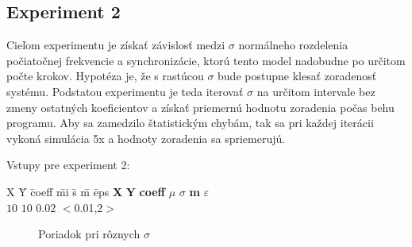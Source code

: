 \documentclass[a4paper, 11pt]{article}
\begin{document}
\subsection{Experiment 2}
Cieľom experimentu je získať závislosť medzi $\sigma$ normálneho rozdelenia počiatočnej frekvencie a synchronizácie, ktorú tento model nadobudne po určitom počte krokov. Hypotéza je, že s rastúcou $\sigma$ bude postupne klesať zoradenosť systému. Podstatou experimentu je teda iterovať $\sigma$ na určitom intervale bez zmeny ostatných koeficientov a získať priemernú hodnotu zoradenia počas behu programu. Aby sa zamedzilo štatistickým chybám, tak sa pri každej iterácii vykoná simulácia 5x a hodnoty zoradenia sa spriemerujú.


\noindent Vstupy pre experiment 2:
\begin{tabbing}
    X \quad \quad \quad \quad\= Y \quad \quad \quad \quad\= coeff \quad  \quad \quad \quad\= mi \quad  \= s \quad  \quad \quad \quad\= m \quad \= eps \kill %
    \textbf{X} \> \textbf{Y} \> \textbf{coeff} \> \textbf{$\mu$} \> \textbf{$\sigma$} \> \textbf{m} \> \textbf{$\varepsilon$}\\ 
    $10$          \> $10$    \> $0.02$        \> $<$0.01,2$>$             
\end{tabbing}

\begin{figure}[h]
    \centering
\caption{Poriadok pri rôznych $\sigma$ \label{Exp1M}}
\end{figure}
\end{document}
